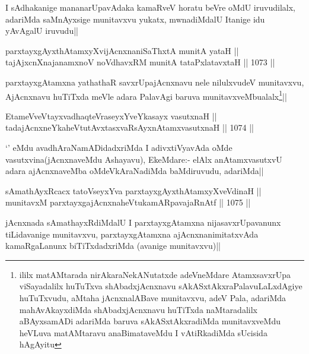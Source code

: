 \begin{artha}
I sAdhakanige mananarUpavAdaka kamaRveV horatu beVre oMdU iruvudilalx, adariMda saMnAyxsige munitavxvu yukatx, mwnadiMdalU Itanige idu yAvAgalU iruvudu||
\end{artha}


\begin{shl}
parxtayxgAyxthAtamxyXvijAcnxnaniSaThxtA munitA yataH || \\
tajAjxcnXnajanamxnoV noVdhavxRM munitA tataPxlatavxtaH ||  1073 ||  
\end{shl}

\begin{artha}
parxtayxgAtamxna yathathaR savxrUpajAcnxnavu nele nilulxvudeV munitavxvu, AjAcnxnavu huTiTxda meVle adara PalavAgi baruva munitavxveMbualalx\footnote{ililx matAMtarada nirAkaraNekANutatxde adeVneMdare AtamxsavxrUpa viSayadalilx huTuTxva shAbadxjAcnxnavu sAkASxtAkxraPalavuLaLxdAgiye huTuTxvudu, aMtaha jAcnxnalABave munitavxvu, adeV Pala, adariMda mahAvAkayxdiMda shAbadxjAcnxnavu huTiTxda naMtaradalilx aBAyxsamADi adariMda baruva sAkASxtAkxradiMda munitavxveMdu heVLuva matAMtaravu anaBimataveMdu I vAtiRkadiMda sUcisida hAgAyitu}||
\end{artha}

\begin{shl}
EtameVveVtayxvadhaqteVraseyxYveYkasayx vasutxnaH || \\
tadajAcnxneYkaheVtutAvxtasxvaRsAyxnAtamxvasutxnaH ||  1074 ||  
\end{shl}

\begin{artha}
`\stext' eMdu avadhAraNamADidadxriMda I adivxtiVyavAda oMde vasutxvina(jAcnxnaveMdu Ashayavu), EkeMdare:- elAlx anAtamxvasutxvU adara ajAcnxnaveMba oMdeVkAraNadiMda baMdiruvudu, adariMda||
\end{artha}

\begin{shl}
sAmathAyxRcacx tatoV\s seyxYva parxtayxgAyxthAtamxyXveVdinaH ||  \\
munitavxM parxtayxgajAcnxnaheVtukamARpavajaRnAtf ||  1075 ||  
\end{shl}

\begin{artha}
jAcnxnada sAmathayxRdiMdalU I parxtayxgAtamxna nijasavxrUpavanunx tiLidavanige munitavxvu, parxtayxgAtamxna ajAcnxnanimitatxvAda kamaRgaLanunx biTiTxdadxriMda (avanige munitavxvu)||
\end{artha}

